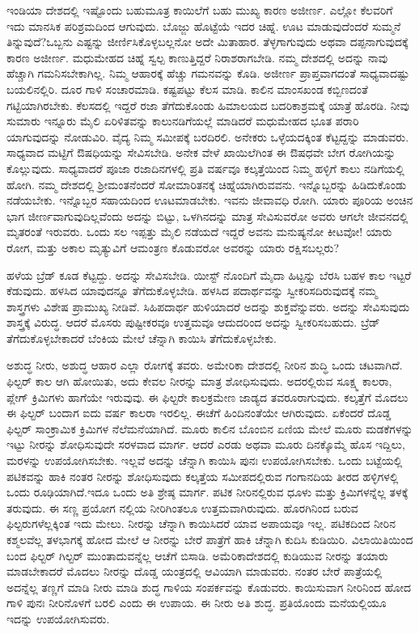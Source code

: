 ಇಂಡಿಯಾ ದೇಶದಲ್ಲಿ ಇಷ್ಟೊಂದು ಬಹುಮೂತ್ರ ಕಾಯಿಲೆಗೆ ಬಹು ಮುಖ್ಯ ಕಾರಣ ಅಜೀರ್ಣ. ಎಲ್ಲೋ ಕೆಲವರಿಗೆ ಇದು ಮಾನಸಿಕ ಪರಿಶ್ರಮದಿಂದ ಆಗುವುದು. ಬೊಜ್ಜು ಹೊಟ್ಟೆಯೆ ಇದರ ಚಿಹ್ನೆ. ಊಟ ಮಾಡುವುದೆಂದರೆ ಸುಮ್ಮನೆ ತಿನ್ನುವುದೆ?ಒಬ್ಬನು ಎಷ್ಟನ್ನು ಜೀರ್ಣಿಸಿಕೊಳ್ಳಬಲ್ಲನೋ ಅದೇ ಮಿತಾಹಾರ. ತೆಳ್ಳಗಾಗುವುದು ಅಥವಾ ದಪ್ಪನಾಗುವುದಕ್ಕೆ ಕಾರಣ ಅಜೀರ್ಣ. ಮಧುಮೇಹದ ಚಿಹ್ನೆ ಸ್ವಲ್ಪ ಕಾಣುತ್ತಿದ್ದರೆ ನಿರಾಶರಾಗಬೇಡಿ. ನಮ್ಮ ದೇಶದಲ್ಲಿ ಅದನ್ನು ನಾವು ಹೆಚ್ಚಾಗಿ ಗಮನಿಸಬೇಕಾಗಿಲ್ಲ. ನಿಮ್ಮ ಆಹಾರಕ್ಕೆ ಹೆಚ್ಚು ಗಮನವನ್ನು ಕೊಡಿ. ಅಜೀರ್ಣ ಪ್ರಾಪ್ತವಾಗದಂತೆ ಸಾಧ್ಯವಾದಷ್ಟು ಬಯಲಿನಲ್ಲಿರಿ. ದೂರ ಗಾಳಿ ಸಂಚಾರಮಾಡಿ. ಕಷ್ಟಪಟ್ಟು ಕೆಲಸ ಮಾಡಿ. ಕಾಲಿನ ಮಾಂಸಖಂಡ ಕಬ್ಬಿಣದಂತೆ ಗಟ್ಟಿಯಾಗಿರಬೇಕು. ಕೆಲಸದಲ್ಲಿ ಇದ್ದರೆ ರಜಾ ತೆಗೆದುಕೊಂಡು ಹಿಮಾಲಯದ ಬದರಿಕಾ\break ಶ್ರಮಕ್ಕೆ ಯಾತ್ರೆ ಹೊರಡಿ. ನೀವು ಸುಮಾರು ಇನ್ನೂರು ಮೈಲಿ ಏರಿಳಿತವನ್ನು ಕಾಲುನಡಿಗೆ\break ಯಲ್ಲೆ ಮಾಡಿದರೆ ಮಧುಮೇಹದ ಭೂತ ಪರಾರಿ ಯಾಗುವುದನ್ನು ನೋಡುವಿರಿ. ವೈದ್ಯ ನಿಮ್ಮ ಸಮೀಪಕ್ಕೆ ಬರದಿರಲಿ. ಅನೇಕರು ಒಳ್ಳೆಯದಕ್ಕಿಂತ ಕೆಟ್ಟದ್ದನ್ನು ಮಾಡುವರು. ಸಾಧ್ಯವಾದ ಮಟ್ಟಿಗೆ ಔಷಧಿಯನ್ನು ಸೇವಿಸಬೇಡಿ. ಅನೇಕ ವೇಳೆ ಖಾಯಿಲೆಗಿಂತ ಈ ಔಷಧವೇ ಬೇಗ ರೋಗಿಯನ್ನು ಕೊಲ್ಲುವುದು. ಸಾಧ್ಯವಾದರೆ ಪೂಜಾ ರಜಾದಿನಗಳಲ್ಲಿ ಪ್ರತಿ ವರ್ಷವೂ ಕಲ್ಕತ್ತೆಯಿಂದ ನಿಮ್ಮ ಹಳ್ಳಿಗೆ ಕಾಲು ನಡಿಗೆಯಲ್ಲಿ ಹೋಗಿ. ನಮ್ಮ ದೇಶದಲ್ಲಿ ಶ‍್ರೀಮಂತನೆಂದರೆ ಸೋಮಾರಿತನಕ್ಕೆ ಚಿಹ್ನೆಯಾಗಿರುವವನು. ಇನ್ನೊಬ್ಬರನ್ನು ಹಿಡಿದುಕೊಂಡು ನಡೆಯಬೇಕು. ಇನ್ನೊಬ್ಬರ ಸಹಾಯದಿಂದ ಊಟಮಾಡಬೇಕು. ಇವನು ಜೀವಾವಧಿ ರೋಗಿ. ಯಾರು ಪೂರಿಯ ಅಂಚಿನ ಭಾಗ ಜೀರ್ಣವಾಗುವುದಿಲ್ಲವೆಂದು ಅದನ್ನು ಬಿಟ್ಟು, ಒಳಗಿನದನ್ನು ಮಾತ್ರ ಸೇವಿಸುವರೋ ಅವರು ಆಗಲೇ ಜೀವನದಲ್ಲಿ ಮೃತರಂತೆ ಇರುವರು. ಒಂದು ಸಲ ಇಪ್ಪತ್ತು ಮೈಲಿ ನಡೆಯದೆ ಇದ್ದರೆ ಅವನು ಮನುಷ್ಯನೋ ಕೀಟವೋ! ಯಾರು ರೋಗ, ಮತ್ತು ಅಕಾಲ ಮೃತ್ಯುವಿಗೆ ಆಮಂತ್ರಣ ಕೊಡುವರೋ ಅವರನ್ನು ಯಾರು ರಕ್ಷಿಸಬಲ್ಲರು?

ಹಳೆಯ ಬ್ರೆಡ್​ ಕೂಡ ಕೆಟ್ಟದ್ದು. ಅದನ್ನು ಸೇವಿಸಬೇಡಿ. ಯೀಸ್ಟ್​ ನೊಂದಿಗೆ ಮೈದಾ ಹಿಟ್ಟನ್ನು ಬೆರಸಿ ಬಹಳ ಕಾಲ ಇಟ್ಟರೆ ಕೆಡುವುದು. ಹಳಸಿದ ಯಾವುದನ್ನೂ ತೆಗೆದುಕೊಳ್ಳಬೇಡಿ. ಹಳಸಿದ ಪದಾರ್ಥವನ್ನು ಸ್ವೀಕರಿಸದಿರುವುದಕ್ಕೆ ನಮ್ಮ ಶಾಸ್ತ್ರಗಳು ವಿಶೇಷ ಪ್ರಾಮುಖ್ಯ ನೀಡಿವೆ. ಸಿಹಿಪದಾರ್ಥ ಹುಳಿಯಾದರೆ ಅದನ್ನು ಶುಕ್ತವೆನ್ನುವರು. ಅದನ್ನು ಸೇವಿಸುವುದು ಶಾಸ್ತ್ರಕ್ಕೆ ವಿರುದ್ಧ. ಆದರೆ ಮೊಸರು ಪುಷ್ಟೀಕರವೂ ಉತ್ತಮವೂ ಆದುದರಿಂದ ಅದನ್ನು ಸ್ವೀಕರಿಸಬಹುದು. ಬ್ರೆಡ್​ ತೆಗೆದುಕೊಳ್ಳಬೇಕಾದರೆ ಬೆಂಕಿಯ ಮೇಲೆ ಚೆನ್ನಾಗಿ ಕಾಯಿಸಿ ತೆಗೆದುಕೊಳ್ಳಬೇಕು.

ಅಶುದ್ಧ ನೀರು, ಅಶುದ್ಧ ಆಹಾರ ಎಲ್ಲಾ ರೋಗಕ್ಕೆ ತವರು. ಅಮೇರಿಕಾ ದೇಶದಲ್ಲಿ ನೀರಿನ ಶುದ್ಧಿ ಒಂದು ಚಟವಾಗಿದೆ. ಫಿಲ್ಟರ್​ ಕಾಲ ಆಗಿ ಹೋಯಿತು, ಅದು ಕೇವಲ ನೀರನ್ನು ಮಾತ್ರ ಶೋಧಿಸುವುದು. ಅದರಲ್ಲಿರುವ ಸೂಕ್ಷ್ಮ ಕಾಲರಾ, ಪ್ಲೇಗ್​ ಕ್ರಿಮಿಗಳು ಹಾಗೆಯೇ ಇರುವುವು. ಈ ಫಿಲ್ಟರೇ ಕಾಲಕ್ರಮೇಣ ಜಾಡ್ಯದ ತವರೂರಾಗುವುದು. ಕಲ್ಕತ್ತೆಗೆ ಮೊದಲು ಈ ಫಿಲ್ಟರ್​ ಬಂದಾಗ ಐದು ವರ್ಷ ಕಾಲರಾ ಇರಲಿಲ್ಲ. ಈಚೆಗೆ ಹಿಂದಿನಂತೆಯೇ ಆಗಿರುವುದು. ಏಕೆಂದರೆ ದೊಡ್ಡ ಫಿಲ್ಟರ್​ ಸಾಂಕ್ರಾಮಿಕ ಕ್ರಿಮಿಗಳ ನೆಲೆಮನೆಯಾಗಿದೆ. ಮೂರು ಕಾಲಿನ ಬೊಂಬಿನ ಏಣಿಯ ಮೇಲೆ ಮೂರು ಮಡಕೆಗಳನ್ನು ಇಟ್ಟು ನೀರನ್ನು ಶೋಧಿಸುವುದೇ ಸರಳವಾದ ಮಾರ್ಗ. ಆದರೆ ಎರಡು ಅಥವಾ ಮೂರು ದಿನಕ್ಕೊಮ್ಮೆ ಹೊಸ ಇದ್ದಿಲು, ಮರಳನ್ನು ಉಪಯೋಗಿಸಬೇಕು. ಇಲ್ಲವೆ ಅದನ್ನು ಚೆನ್ನಾಗಿ ಕಾಯಿಸಿ ಪುನಃ ಉಪಯೋಗಿಸಬೇಕು. ಒಂದು ಬಟ್ಟೆಯಲ್ಲಿ ಪಟಿಕವನ್ನು ಹಾಕಿ ನಂತರ ನೀರನ್ನು ಶೋಧಿಸುವುದು ಕಲ್ಕತ್ತೆಯ ಸಮೀಪದಲ್ಲಿರುವ ಗಂಗಾನದಿಯ ತೀರದ ಹಳ್ಳಿಗಳಲ್ಲಿ ಒಂದು ರೂಢಿಯಾಗಿದೆ.ಇದೂ ಒಂದು ಅತಿ ಶ್ರೇಷ್ಠ ಮಾರ್ಗ. ಪಟಿಕ ನೀರಿನಲ್ಲಿರುವ ಧೂಳು ಮತ್ತು ಕ್ರಿಮಿಗಳನ್ನೆಲ್ಲ ತಳಕ್ಕೆ ತರುವುದು. ಈ ಸಣ್ಣ ಪ್ರಯೋಗ ನಲ್ಲಿಯ ನೀರಿಗಿಂತಲೂ ಉತ್ತಮವಾಗಿರುವುದು. ಹೊರಗಿನಿಂದ ಬರುವ ಫಿಲ್ಟರುಗಳೆಲ್ಲಕ್ಕಿಂತ ಇದು ಮೇಲು. ನೀರನ್ನು ಚೆನ್ನಾಗಿ ಕಾಯಿಸಿದರೆ ಯಾವ ಅಪಾಯವೂ ಇಲ್ಲ. ಪಟಿಕದಿಂದ ನೀರಿನ ಕಶ್ಮಲವೆಲ್ಲ ತಳಭಾಗಕ್ಕೆ ಹೋದ ಮೇಲೆ ಆ ನೀರನ್ನು ಬೇರೆ ಪಾತ್ರೆಗೆ ಹಾಕಿ ಚೆನ್ನಾಗಿ ಕುದಿಸಿ ಕುಡಿಯಿರಿ. ವಿಲಾಯಿತಿಯಿಂದ ಬಂದ ಫಿಲ್ಟರ್​ ಗಿಲ್ಟರ್​ ಮುಂತಾದುವನ್ನೆಲ್ಲ ಆಚೆಗೆ ಬಿಸಾಡಿ. ಅಮೆರಿಕಾದೇಶದಲ್ಲಿ ಕುಡಿಯುವ ನೀರನ್ನು ತಯಾರು ಮಾಡಬೇಕಾದರೆ ಮೊದಲು ನೀರನ್ನು ದೊಡ್ಡ ಯಂತ್ರದಲ್ಲಿ ಆವಿಯಾಗಿ ಮಾಡುವರು. ನಂತರ ಬೇರೆ ಪಾತ್ರೆಯಲ್ಲಿ ಅದನ್ನೆಲ್ಲ ತಣ್ಣಗೆ ಮಾಡಿ ನೀರು ಮಾಡಿ ಶುದ್ಧ ಗಾಳಿಯ ಸಂಪರ್ಕವನ್ನು ಕೊಡುವರು. ಕಾಯಿಸುವಾಗ ನೀರಿನಿಂದ ಹೋದ ಗಾಳಿ ಪುನಃ ನೀರಿನೊಳಗೆ ಬರಲಿ ಎಂದು ಈ ಉಪಾಯ. ಈ ನೀರು ಅತಿ ಶುದ್ಧ. ಪ್ರತಿಯೊಂದು ಮನೆಯಲ್ಲಿಯೂ ಇದನ್ನು ಉಪಯೋಗಿಸುವರು.

